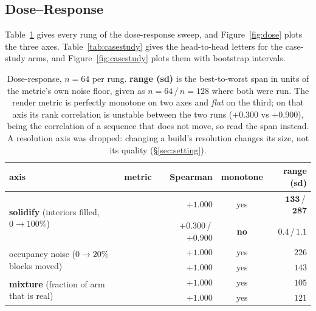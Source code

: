 \subsection{Dose--Response}

Table~\ref{tab:dose} gives every rung of the dose-response sweep, and
Figure~\ref{fig:dose} plots the three axes. Table~\ref{tab:casestudy} gives the
head-to-head letters for the case-study arms, and Figure~\ref{fig:casestudy}
plots them with bootstrap intervals.

\begin{table}[t]
\centering
\small
\caption{Dose-response, $n{=}64$ per rung. \textbf{range (sd)} is the
best-to-worst span in units of the metric's own noise floor, given as
$n{=}64$\,/\,$n{=}128$ where both were run. The render metric is perfectly
monotone on two axes and \emph{flat} on the third; on that axis its rank
correlation is unstable between the two runs ($+0.300$ vs $+0.900$), being the
correlation of a sequence that does not move, so read the span instead. A
resolution axis was dropped: changing a build's resolution changes its size, not
its quality (\S\ref{sec:setting}).}
\label{tab:dose}
\begin{tabular}{llrcr}
\toprule
axis & metric & Spearman & monotone & range (sd) \\
\midrule
\multirow{2}{*}{\textbf{solidify} (interiors filled, $0\!\to\!100\%$)}
  & \vkid{} & $+1.000$ & yes & $\mathbf{133}$\,/\,$\mathbf{287}$ \\
  & \mvkid{}   & $+0.300$\,/\,$+0.900$ & \textbf{no} & $\mathbf{0.4}$\,/\,$\mathbf{1.1}$ \\
\midrule
\multirow{2}{*}{occupancy noise ($0\!\to\!20\%$ blocks moved)}
  & \vkid{} & $+1.000$ & yes & $226$ \\
  & \mvkid{}   & $+1.000$ & yes & $143$ \\
\midrule
\multirow{2}{*}{\textbf{mixture} (fraction of arm that is real)}
  & \vkid{} & $+1.000$ & yes & $105$ \\
  & \mvkid{}   & $+1.000$ & yes & $121$ \\
\bottomrule
\end{tabular}
\end{table}


